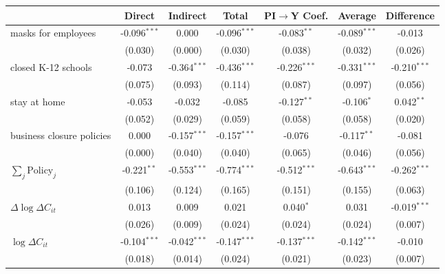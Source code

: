 
\begin{tabular}{lccccc|>{}c}
\toprule
  & Direct & Indirect & Total & PI$\to$Y Coef. & Average & Difference\\
\midrule
masks for employees & -0.096$^{***}$ & 0.000 & -0.096$^{***}$ & -0.083$^{**}$ & -0.089$^{***}$ & -0.013\\
 & (0.030) & (0.000) & (0.030) & (0.038) & (0.032) & (0.026)\\
closed K-12 schools & -0.073 & -0.364$^{***}$ & -0.436$^{***}$ & -0.226$^{***}$ & -0.331$^{***}$ & -0.210$^{***}$\\
 & (0.075) & (0.093) & (0.114) & (0.087) & (0.097) & (0.056)\\
stay at home & -0.053 & -0.032 & -0.085 & -0.127$^{**}$ & -0.106$^{*}$ & 0.042$^{**}$\\
 & (0.052) & (0.029) & (0.059) & (0.058) & (0.058) & (0.020)\\
business closure policies & 0.000 & -0.157$^{***}$ & -0.157$^{***}$ & -0.076 & -0.117$^{**}$ & -0.081\\
 & (0.000) & (0.040) & (0.040) & (0.065) & (0.046) & (0.056)\\
$\sum_j \mathrm{Policy}_j$ & -0.221$^{**}$ & -0.553$^{***}$ & -0.774$^{***}$ & -0.512$^{***}$ & -0.643$^{***}$ & -0.262$^{***}$\\
 & (0.106) & (0.124) & (0.165) & (0.151) & (0.155) & (0.063)\\
$\Delta \log \Delta C_{it}$ & 0.013 & 0.009 & 0.021 & 0.040$^{*}$ & 0.031 & -0.019$^{***}$\\
 & (0.026) & (0.009) & (0.024) & (0.024) & (0.024) & (0.007)\\
$\log \Delta C_{it}$ & -0.104$^{***}$ & -0.042$^{***}$ & -0.147$^{***}$ & -0.137$^{***}$ & -0.142$^{***}$ & -0.010\\
 & (0.018) & (0.014) & (0.024) & (0.021) & (0.023) & (0.007)\\
\bottomrule
\end{tabular}